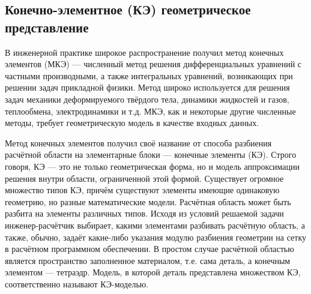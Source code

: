 
\subsection{Конечно-элементное (КЭ) геометрическое представление}\label{sec:secGeoFEM}

В инженерной практике широкое распространение получил метод конечных элементов (МКЭ) --- численный метод решения дифференциальных уравнений с частными производными, а также интегральных уравнений, возникающих при решении задач прикладной физики. Метод широко используется для решения задач механики деформируемого твёрдого тела, динамики жидкостей и газов, теплообмена, электродинамики и т.д. МКЭ, как и некоторые другие численные методы, требует геометрическую модель в качестве входных данных.

Метод конечных элементов получил своё название от способа разбиения расчётной области на элементарные блоки --- конечные элементы (КЭ). Строго говоря, КЭ --- это не только геометрическая форма, но и модель аппроксимации решения внутри области, ограниченной этой формой. Существует огромное множество типов КЭ, причём существуют элементы имеющие одинаковую геометрию, но разные математические модели. Расчётная область может быть разбита на элементы различных типов. Исходя из условий решаемой задачи инженер-расчётчик выбирает, какими элементами разбивать расчётную область, а также, обычно, задаёт какие-либо указания модулю разбиения геометрии на сетку в расчётном программном обеспечении. В простом случае расчётной областью является пространство заполненное материалом, т.е. сама деталь, а конечным элементом --- тетраэдр. Модель, в которой деталь представлена множеством КЭ, соответственно называют КЭ-моделью.



